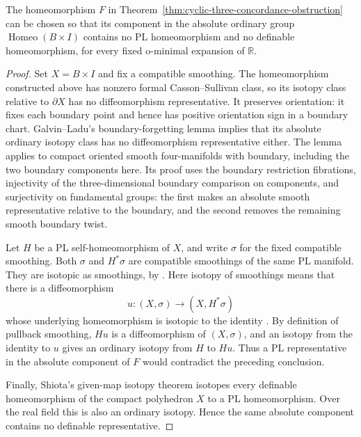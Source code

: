 \begin{corollary}\label{cor:cyclic-three-absolute-obstruction}
The homeomorphism $F$ in
Theorem~\ref{thm:cyclic-three-concordance-obstruction} can be chosen so
that its component in the absolute ordinary group
$\operatorname{Homeo}(B\times I)$ contains no PL homeomorphism and
no definable homeomorphism, for every fixed o-minimal expansion of
$\mathbb R$.
\end{corollary}

\begin{proof}
Set $X=B\times I$ and fix a compatible smoothing. The homeomorphism
constructed above has nonzero formal Casson--Sullivan class, so its
isotopy class relative to $\partial X$ has no diffeomorphism
representative. It preserves orientation: it fixes each boundary
point and hence has positive orientation sign in a boundary chart.
Galvin--Ladu's boundary-forgetting lemma
\cite[Lemma~5.3, pp.~17--18]{GalvinLadu2025Boundary}
implies that its absolute ordinary isotopy class has no
diffeomorphism representative either. The lemma applies to compact
oriented smooth four-manifolds with boundary, including the two
boundary components here. Its proof uses the boundary restriction
fibrations, injectivity of the three-dimensional boundary comparison
on components, and surjectivity on fundamental groups: the first
makes an absolute smooth representative relative to the boundary,
and the second removes the remaining smooth boundary twist.

Let $H$ be a PL self-homeomorphism of $X$, and write $\sigma$ for
the fixed compatible smoothing. Both $\sigma$ and $H^*\sigma$
are compatible smoothings of the same PL manifold. They are isotopic
as smoothings, by
\cite[Theorem~3.5(2), pp.~17--18; boundary convention p.~8]
{FriedlNagelOrsonPowell2025}.
Here isotopy of smoothings means that there is a diffeomorphism
\[
 u:(X,\sigma)\longrightarrow(X,H^*\sigma)
\]
whose underlying homeomorphism is isotopic to the identity
\cite[Preface, pp.~v--vi]{HirschMazur1974}.
By definition of pullback smoothing, $Hu$ is a diffeomorphism of
$(X,\sigma)$, and an isotopy from the identity to $u$ gives an
ordinary isotopy from $H$ to $Hu$. Thus a PL representative in the
absolute component of $F$ would contradict the preceding conclusion.

Finally, Shiota's given-map isotopy theorem
\cite[Complement to Theorem~2.1, pp.~17--18]{Shiota2010}
isotopes every definable homeomorphism of the compact polyhedron
$X$ to a PL homeomorphism. Over the real field this is also an
ordinary isotopy. Hence the same absolute component contains no
definable representative.
\end{proof}


